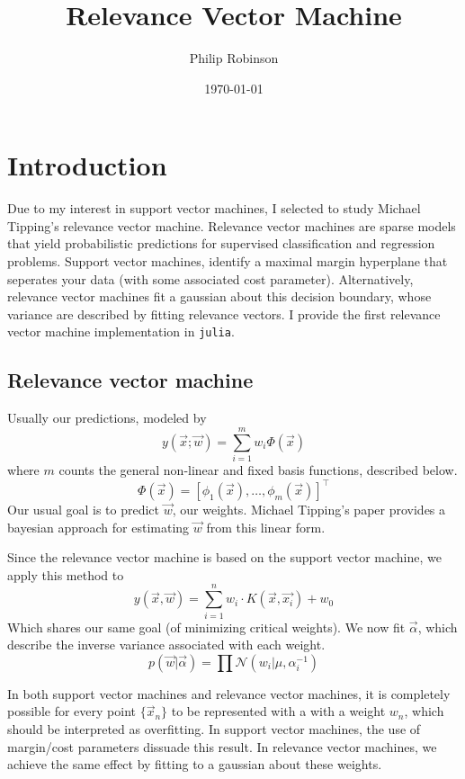 \documentclass[11pt]{article} %
\title{Relevance Vector Machine}
\date{\today}
\author{Philip Robinson}
\affil{Oregon Health Sciences University}
\def\rv{relevance vector\xspace}
\def\RVM{Relevance vector machine\xspace}
\def\rvm{\rv machine\xspace}
\def\SVM{Support vector machine\xspace}
\def\svm{support vector machine\xspace}
\def\julia{\texttt{julia}\xspace}
\def\MT{Michael Tipping\xspace}
\begin{document}
\maketitle


\section{Introduction}
Due to my interest in \svm{}s, I selected to study \MT's \rvm.
\RVM{}s are sparse models that yield probabilistic predictions
for supervised classification and regression problems. \SVM{}s,
identify a maximal margin hyperplane that seperates your data
(with some associated cost parameter). Alternatively, \rvm{}s
fit a gaussian about this decision boundary, whose variance
are described by fitting \rv{}s. I provide the first \rvm
implementation in \julia.

\subsection{\RVM}
Usually our predictions, modeled by
\[y(\vec{x}; \vec{w}) = \sum_{i=1}^m w_i \Phi(\vec{x})\]
where $m$ counts the general non-linear and fixed basis
functions, described below.
\[\Phi(\vec{x}) = \left[\phi_1(\vec{x}), \dots, \phi_m(\vec{x})\right]^\intercal\]
Our usual goal is to predict $\vec{w}$, our weights.
\MT's paper provides a bayesian approach for estimating
$\vec{w}$ from this linear form.

Since the \rvm is based on the \svm, we apply this method to
\[y(\vec{x},\vec{w})=\sum_{i=1}^n w_i\cdot K(\vec{x}, \vec{x_i}) + w_0\]
Which shares our same goal (of minimizing critical weights).
We now fit $\vec{\alpha}$, which describe the inverse variance
associated with each weight.
\[p(\vec{w}|\vec{\alpha}) = \prod\mathcal{N}(w_i |\mu,\alpha_i^{-1})\]

In both \svm{}s and \rvm{}s, it is completely possible for
every point \(\{\vec{x}_n\}\) to be represented with a with a
weight $w_n$, which should be interpreted as overfitting. In
\svm{}s, the use of margin/cost parameters dissuade this result.
In \rvm{}s, we achieve the same effect by fitting to a gaussian
about these weights.
\end{document}
